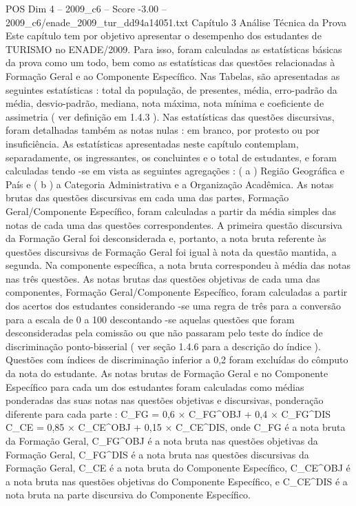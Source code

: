 \begin{textsample}{POS Dim 4 – 2009\_c6 – Score -3.00 – 2009\_c6/enade\_2009\_tur\_dd94a14051.txt}  \label{ex:f4_pos_323}
Capítulo 3 Análise Técnica da Prova Este capítulo tem por objetivo apresentar o desempenho dos estudantes de TURISMO no ENADE/2009.
Para isso, foram calculadas as estatísticas básicas da prova como um todo, bem como as estatísticas das questões relacionadas à Formação Geral e ao Componente Específico.
Nas Tabelas, são apresentadas as seguintes estatísticas : total da população, de presentes, média, erro-padrão da média, desvio-padrão, mediana, nota máxima, nota mínima e coeficiente de assimetria ( ver definição em 1.4.3 ).
Nas estatísticas das questões discursivas, foram detalhadas também as notas nulas : em branco, por protesto ou por insuficiência.
As estatísticas apresentadas neste capítulo contemplam, separadamente, os ingressantes, os concluintes e o total de estudantes, e foram calculadas tendo -se em vista as seguintes agregações : ( a ) Região Geográfica e País e ( b ) a Categoria Administrativa e a Organização Acadêmica.
As notas brutas das questões discursivas em cada uma das partes, Formação Geral/Componente Específico, foram calculadas a partir da média simples das notas de cada uma das questões correspondentes.
A primeira questão discursiva da Formação Geral foi desconsiderada e, portanto, a nota bruta referente às questões discursivas de Formação Geral foi igual à nota da questão mantida, a segunda.
Na componente específica, a nota bruta correspondeu à média das notas nas três questões.
As notas brutas das questões objetivas de cada uma das componentes, Formação Geral/Componente Específico, foram calculadas a partir dos acertos dos estudantes considerando -se uma regra de três para a conversão para a escala de 0 a 100 descontando -se aquelas questões que foram desconsideradas pela comissão ou que não passaram pelo teste do índice de discriminação ponto-bisserial ( ver seção 1.4.6 para a descrição do índice ).
Questões com índices de discriminação inferior a 0,2 foram excluídas do cômputo da nota do estudante.
As notas brutas de Formação Geral e no Componente Específico para cada um dos estudantes foram calculadas como médias ponderadas das suas notas nas questões objetivas e discursivas, ponderação diferente para cada parte : C\_FG = 0,6 × C\_FG\textasciicircum{}OBJ + 0,4 × C\_FG\textasciicircum{}DIS C\_CE = 0,85 × C\_CE\textasciicircum{}OBJ + 0,15 × C\_CE\textasciicircum{}DIS, onde C\_FG é a nota bruta da Formação Geral, C\_FG\textasciicircum{}OBJ é a nota bruta nas questões objetivas da Formação Geral, C\_FG\textasciicircum{}DIS é a nota bruta nas questões discursivas da Formação Geral, C\_CE é a nota bruta do Componente Específico, C\_CE\textasciicircum{}OBJ é a nota bruta nas questões objetivas do Componente Específico, e C\_CE\textasciicircum{}DIS é a nota bruta na parte discursiva do Componente Específico.

\end{textsample}
